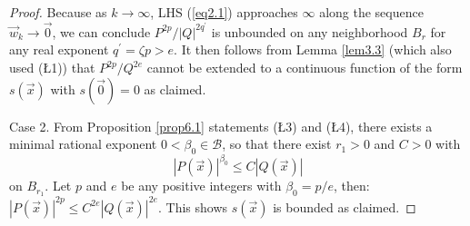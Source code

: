 \documentclass[12pt]{amsart}
\theoremstyle{definition}
\theoremstyle{remark}
\numberwithin{equation}{section}
\newcommand{\re}{\mathbb{R}}
\newcommand{\Bb}{\mathcal{B}}
\begin{document}
\begin{proof}
    
    Because as $k\to\infty$, LHS (\ref{eq2.1}) approaches $\infty$ along the sequence $\vec w_k\to\vec0$, we can conclude $P^{2p}/|Q|^{2q^\prime}$ is unbounded on any neighborhood $B_r$ for any real exponent $q^\prime=\zeta p>e$.  It then follows from Lemma \ref{lem3.3} (which also used (\L1)) that  $P^{2p}/Q^{2e}$ cannot be extended to a continuous function of the form $s(\vec x)$ with $s(\vec0)=0$ as claimed.


Case 2.  From Proposition \ref{prop6.1} statements (\L3) and (\L4), there exists a minimal rational exponent $0<\beta_0\in\Bb$, so that there exist $r_1>0$ and $C>0$ with 
\begin{equation}\label{eq5.5}
  |P(\vec x)|^{\beta_0}\le C\left|Q(\vec x)\right|
\end{equation}
on $B_{r_1}$.  Let $p$ and $e$ be any positive integers with $\beta_0=p/e$, then: $|P(\vec x)|^{2p}\le C^{2e}\left|Q(\vec x)\right|^{2e}$.  This shows $s(\vec x)$ is bounded as claimed.


\end{proof}
\end{document}
